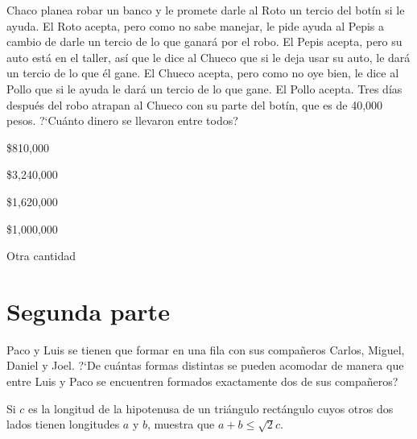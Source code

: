 \begin{Problema}{10}
  Chaco planea robar un banco y le promete darle al Roto un tercio del
  bot\'in si le ayuda. El Roto acepta, pero como no sabe manejar, le
  pide ayuda al Pepis a cambio de darle un tercio de lo que ganar\'a
  por el robo. El Pepis acepta, pero su auto est\'a en el taller,
  as\'i que le dice al Chueco que si le deja usar su auto, le dar\'a
  un tercio de lo que \'el gane. El Chueco acepta, pero como no oye
  bien, le dice al Pollo que si le ayuda le dar\'a un tercio de lo que
  gane. El Pollo acepta. Tres d\'ias despu\'es del robo atrapan al
  Chueco con su parte del bot\'in, que es de 40,000 pesos.  ?`Cu\'anto
  dinero se llevaron entre todos?

  \begin{inparaenum}
  \item \$810,000 \quad\quad
  \item \$3,240,000 \quad\quad
  \item \$1,620,000 \quad\quad
  \item \$1,000,000 \quad\quad 
  \item Otra cantidad
  \end{inparaenum}
\end{Problema}

\begin{Solucion}
  
\end{Solucion}

\section{Segunda parte}
\label{sec:segunda-parte}

\begin{Problema}{11}
  Paco y Luis se tienen que formar en una fila con sus compa\~neros
  Carlos, Miguel, Daniel y Joel. ?`De cu\'antas formas distintas se
  pueden acomodar de manera que entre Luis y Paco se encuentren
  formados exactamente dos de sus compa\~neros?
\end{Problema}

\begin{Solucion}
  
\end{Solucion}

\begin{Problema}{12}
  Si $c$ es la longitud de la hipotenusa de un tri\'angulo
  rect\'angulo cuyos otros dos lados tienen longitudes $a$ y $b$,
  muestra que $a+b\leq\sqrt{2}c$.
\end{Problema}

